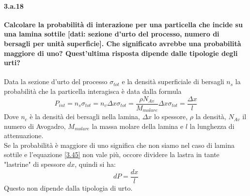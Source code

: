 \documentclass[twoside]{article}
\begin{document}
\paragraph{3.a.18}\textbf{Calcolare la probabilità di interazione per una particella che incide su una lamina sottile [dati: sezione d'urto del processo, numero di bersagli per unità superficie]. Che significato avrebbe una probabilità maggiore di uno? Quest'ultima risposta dipende dalle tipologie degli urti?}\\ 
\\
Data la sezione d'urto del processo $\sigma_{tot}$ e la densità superficiale di bersagli $n_s$ la probabilità che la particella interagisca è data dalla formula
\begin{equation}\label{3.45}
    P_{int}=n_s\sigma_{tot}=n_v\Delta x\sigma_{tot}=\frac{\rho N_{Av}}{M_{molare}}\Delta x\sigma_{tot}=\frac{\Delta x}{l}
\end{equation}
Dove $n_c$ è la densità dei bersagli nella lamina, $\Delta x$ lo spessore, $\rho$ la densità, $N_{Av}$ il numero di Avogadro, $M_{molare}$ la massa molare della lamina e $l$ la lunghezza di attenuazione. \\
Se la probabilità è maggiore di uno significa che non siamo nel caso di lamina sottile e l'equazione \ref{3.45} non vale più, occore dividere la lastra in tante "lastrine" di spessore $dx$, quindi si ha:
\begin{equation}
    dP=\frac{dx}{l}
\end{equation}
Questo non dipende dalla tipologia di urto.
\end{document}
